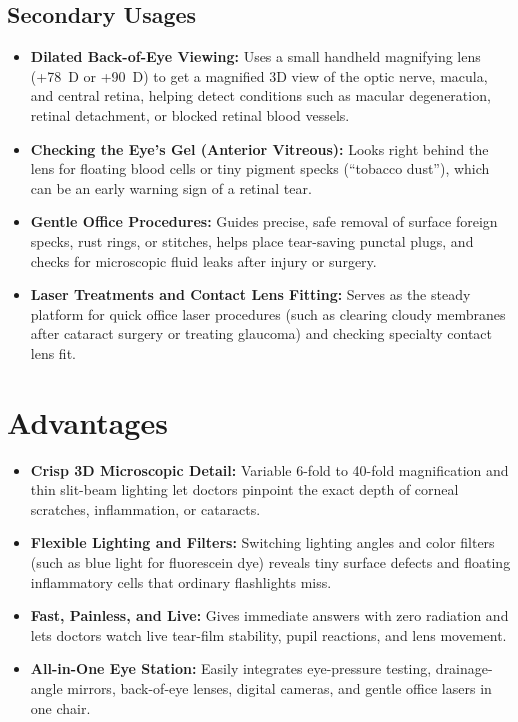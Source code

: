 \subsection{Secondary Usages}

\begin{itemize}
    \item \textbf{Dilated Back-of-Eye Viewing:} Uses a small handheld magnifying lens (+78~D or +90~D) to get a magnified 3D view of the optic nerve, macula, and central retina, helping detect conditions such as macular degeneration, retinal detachment, or blocked retinal blood vessels.
    \item \textbf{Checking the Eye's Gel (Anterior Vitreous):} Looks right behind the lens for floating blood cells or tiny pigment specks (``tobacco dust''), which can be an early warning sign of a retinal tear.
    \item \textbf{Gentle Office Procedures:} Guides precise, safe removal of surface foreign specks, rust rings, or stitches, helps place tear-saving punctal plugs, and checks for microscopic fluid leaks after injury or surgery.
    \item \textbf{Laser Treatments and Contact Lens Fitting:} Serves as the steady platform for quick office laser procedures (such as clearing cloudy membranes after cataract surgery or treating glaucoma) and checking specialty contact lens fit.
\end{itemize}

\section{Advantages}

\begin{itemize}
    \item \textbf{Crisp 3D Microscopic Detail:} Variable 6-fold to 40-fold magnification and thin slit-beam lighting let doctors pinpoint the exact depth of corneal scratches, inflammation, or cataracts.
    \item \textbf{Flexible Lighting and Filters:} Switching lighting angles and color filters (such as blue light for fluorescein dye) reveals tiny surface defects and floating inflammatory cells that ordinary flashlights miss.
    \item \textbf{Fast, Painless, and Live:} Gives immediate answers with zero radiation and lets doctors watch live tear-film stability, pupil reactions, and lens movement.
    \item \textbf{All-in-One Eye Station:} Easily integrates eye-pressure testing, drainage-angle mirrors, back-of-eye lenses, digital cameras, and gentle office lasers in one chair.
\end{itemize}

